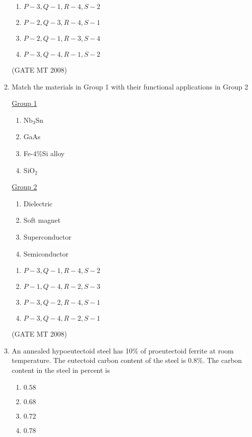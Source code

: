 \documentclass[11pt, letterpaper]{article}
\theoremstyle{remark}
\begin{document}
\begin{enumerate}
\begin{multicols}{2}
\begin{enumerate} 
\item $P-3, Q-1, R-4, S-2$
\item $P-2, Q-3, R-4, S-1$
\item $P-2, Q-1, R-3, S-4$
\item $P-3, Q-4, R-1, S-2$
\end{enumerate}
\end{multicols}
\hfill(GATE MT 2008) 

\item Match the materials in Group 1 with their functional applications in Group 2
\begin{multicols}{2}
\underline{Group 1}
\begin{enumerate}[label=(\Alph*), start=16]
\item Nb$_3$Sn
\item GaAs 
\item Fe-$4$\%Si alloy
\item SiO$_2$
\end{enumerate}

\underline{Group 2}
\begin{enumerate}[label=(\arabic*), start=1]
\item Dielectric
\item Soft magnet
\item Superconductor  
\item Semiconductor
\end{enumerate}
\end{multicols}

\begin{multicols}{2}
\begin{enumerate} 
\item $P-3, Q-1, R-4, S-2$
\item $P-1, Q-4, R-2, S-3$
\item $P-3, Q-2, R-4, S-1$
\item $P-3, Q-4, R-2, S-1$
\end{enumerate}
\end{multicols}
\hfill(GATE MT 2008) 

\item An annealed hypoeutectoid steel has 10\% of proeutectoid ferrite at room temperature. The eutectoid carbon content of the steel is 0.8\%. The carbon content in the steel in percent is

\begin{multicols}{4}
\begin{enumerate} 
\item $0.58$ 
\item $0.68$ 
\item $0.72$ 
\item $0.78$
\end{enumerate}
\end{multicols}


\end{enumerate}
\end{document}
